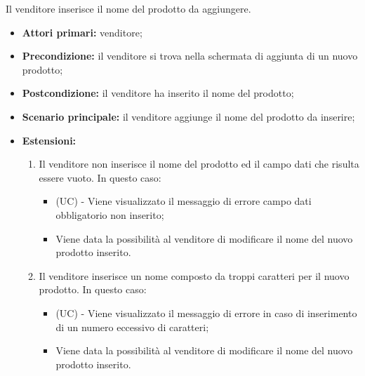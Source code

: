 Il venditore inserisce il nome del prodotto da aggiungere.
\begin{itemize}
    \item \textbf{Attori primari:} venditore;
    \item \textbf{Precondizione:} il venditore si trova nella schermata di aggiunta di un nuovo prodotto;
    \item \textbf{Postcondizione:} il venditore ha inserito il nome del prodotto;
    \item \textbf{Scenario principale:} il venditore aggiunge il nome del prodotto da inserire;
    \item \textbf{Estensioni:} 
    \begin{enumerate}[label=\lett]
    	\item Il venditore non inserisce il nome del prodotto ed il campo dati che risulta essere vuoto. In questo caso:
	    \begin{itemize}
	        \item (UC) - Viene visualizzato il messaggio di errore campo dati obbligatorio non inserito;
	        \item Viene data la possibilità al venditore di modificare il nome del nuovo prodotto inserito.
	    \end{itemize}
    	\item Il venditore inserisce un nome composto da troppi caratteri per il nuovo prodotto. In questo caso:
    	\begin{itemize}
    		\item (UC) - Viene visualizzato il messaggio di errore in caso di inserimento di un numero eccessivo di caratteri;
    		\item Viene data la possibilità al venditore di modificare il nome del nuovo prodotto inserito.
    	\end{itemize}
	\end{enumerate}
\end{itemize}

